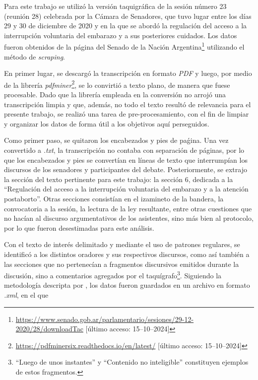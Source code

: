 Para este trabajo se utilizó la versión {taquigr\'afica} de la sesión número
23 (reunión 28) celebrada por la {C\'amara} de Senadores, que tuvo lugar entre los días
29 y 30 de diciembre de 2020 y en la que se abordó la
regulación del acceso a la interrupción voluntaria del embarazo y a sus
posteriores cuidados. Los datos fueron obtenidos de la {p\'agina} del Senado de la Nación
Argentina\footnote{\url{https://www.senado.gob.ar/parlamentario/sesiones/29-12-2020/28/downloadTac}
[último acceso: 15--10--2024]}
utilizando el método de \textit{scraping}.\par
En primer lugar, se descargó la transcripción en formato \textit{PDF} y luego, por
medio de la librería \textit{pdfminer}\footnote{\url{https://pdfminersix.readthedocs.io/en/latest/}
[último acceso: 15--10--2024]},
se lo convirtió a texto plano, de manera que fuese procesable. Dado que la librería
empleada en la conversión no arrojó una transcripción limpia y que, {adem\'as}, no todo el texto
resultó de relevancia para el presente trabajo, se {realiz\'o} una tarea de
pre-procesamiento, con el fin de limpiar y organizar los datos de forma útil a los
objetivos aquí perseguidos.\par
Como primer paso, se quitaron los encabezados y pies de paǵina.
Una vez convertido a \textit{.txt}, la transcripción no contaba con separación de
{p\'aginas}, por lo que los encabezados y pies se convertían en líneas de texto que
interrumpían los discursos de los senadores y participantes del debate.
Posteriormente, se extrajo la sección del texto pertinente para este trabajo:
la sección 6, dedicada a la ``Regulación  del  acceso  a  la  interrupción
voluntaria  del  embarazo  y  a  la atención postaborto''. Otras secciones consistían
en el izamineto de la bandera, la convocatoria a la sesión, la lectura de la ley
resultante, entre otras cuestiones que no hacían al discurso argumentativos de los
asistentes, sino {m\'as} bien al protocolo, por lo que fueron desestimadas
para este {an\'alisis}.\par
Con el texto de interés delimitado y mediante el uso de patrones regulares, se
identificó a los distintos oradores y sus respectivos discursos, como así también
a las secciones que no pertenecían a fragmentos discursivos emitidos durante la
discusión, sino a comentarios agregados por el taquígrafo\footnote{``Luego de unos
instantes'' y ``Contenido no inteligible'' constituyen ejemplos de estos
fragmentos.}. Siguiendo la metodología descripta por \cite{monroe2008fightin},
los datos fueron guardados en un archivo en formato \textit{.xml}, en el que

